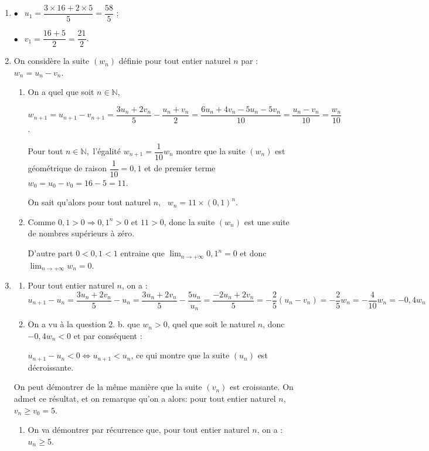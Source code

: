 \documentclass[10pt]{article}
\providecommand{\N}{\mathbb{N}}
\begin{document}
\begin{enumerate}
\item 

$\bullet~~$ $u_1 = \dfrac{3\times 16 + 2 \times 5}{5} = \dfrac{58}{5}$ ;

$\bullet~~$ $v_1 = \dfrac{16 +5}{2} = \dfrac{21}{2}$.

\item On considère la suite $\left(w_n\right)$ définie pour tout entier naturel $n$ par : $w_n = u_n - v_n$.
	\begin{enumerate}
		\item 
		On a quel que soit $n \in \N$, 
		
		$w_{n+1} = u_{n+1} - v_{n+1} = \dfrac{3u_n + 2v_n}{5} - \dfrac{u_n + v_n}{2} = \dfrac{6u_n + 4v_n - 5u_n - 5v_n}{10} = \dfrac{u_n - v_n}{10} = \dfrac{w_n}{10}$.
		
Pour tout $n \in \N$,\, l'égalité $w_{n+1} = \dfrac{1}{10}w_n$ montre que la suite $\left(w_n\right)$ est géométrique de raison $\dfrac{1}{10} = 0,1$ et de premier terme $w_0 = u_0 - v_0 = 16 - 5 = 11$.
		

On sait qu'alors pour tout naturel $n$, \, $w_n = 11 \times (0,1)^n$.
		\item 
		Comme $0,1 > 0 \Rightarrow 0,1^n > 0$ et $11 > 0$, donc la suite $\left(w_n\right)$ est une suite de nombres supérieurs à zéro.
		
		D'autre part $0 < 0,1 < 1$ entraine que $\displaystyle\lim_{n \to + \infty} 0,1^n = 0$ et donc $\displaystyle\lim_{n \to + \infty} w_n = 0$.
	\end{enumerate}
\item 
	\begin{enumerate}
		\item 
		Pour tout entier naturel $n$, on a : $u_{n+1} - u_n = \dfrac{3u_n + 2v_n}{5} - u_n =  \dfrac{3u_n + 2v_n}{5} - \dfrac{5u_n}{u_n} = \dfrac{- 2u_n + 2v_n}{5} = - \dfrac{2}{5}\left(u_n - v_n  \right) = - \dfrac{2}{5}w_n = - \dfrac{4}{10}w_n = - 0,4w_n$
		\item 
On a vu à la question 2. b. que $w_n > 0$, quel que soit le naturel $n$, donc $- 0,4w_n < 0$ et par conséquent :

$u_{n+1} - u_n < 0 \iff u_{n+1} < u_n$, ce qui montre que la suite $\left(u_n\right)$ est décroissante.
\end{enumerate}
		
On peut démontrer de la même manière que la suite $\left(v_n\right)$ est croissante. On admet ce résultat, et on remarque qu'on a alors: pour tout entier naturel $n$,\, $v_n \geqslant v_0 = 5$.
\begin{enumerate}[resume]
		\item  On va démontrer par récurrence que, pour tout entier naturel $n$, on a : $u_n \geqslant 5$. 
		

\end{enumerate}
\end{enumerate}
\end{document}

